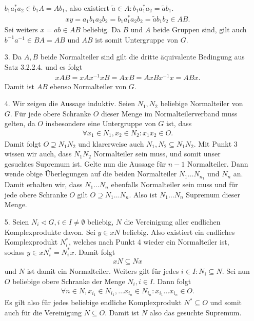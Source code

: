 \begin{solution}
\begin{itemize}
  $b_1a_1^*a_2 \in b_1A = Ab_1$, also existiert $\widetilde{a} \in A: b_1a_1^*a_2 = \widetilde{a}b_1$.
  \begin{align*}
    xy = a_1b_1a_2b_2 = b_1a_1^*a_2b_2 = \widetilde{a}b_1b_2 \in AB.
  \end{align*}
  Sei weiters $x = ab \in AB$ beliebig. Da $B$ und $A$ beide Gruppen sind, gilt
  auch $b^{-1}a^{-1} \in BA = AB$ und $AB$ ist somit Untergruppe von $G$.
  \item [3.] Da $A,B$ beide Normalteiler sind gilt die dritte äquivalente Bedingung
  aus Satz 3.2.2.4. und es folgt
  \begin{align*}
    xAB = xAx^{-1}xB = AxB = AxBx^{-1}x = ABx.
  \end{align*}
  Damit ist $AB$ ebenso Normalteiler von $G$.
  \item [4.] Wir zeigen die Aussage induktiv.
  Seien $N_1,N_2$ beliebige Normalteiler von $G$. Für jede
  obere Schranke $O$ dieser Menge im Normalteilerverband muss gelten, da $O$
  insbesondere eine Untergruppe von $G$ ist, dass
  \begin{align*}
    \forall x_1 \in N_1, x_2 \in N_2: x_1x_2 \in O.
  \end{align*}
  Damit folgt $O \supseteq N_1N_2$ und klarerweise auch $N_1,N_2 \subseteq N_1N_2$.
  Mit Punkt 3 wissen wir auch, dass $N_1N_2$
  Normalteiler sein muss, und somit unser gesuchtes Supremum ist.
  Gelte nun die Aussage für $n - 1$ Normalteiler. Dann wende obige Überlegungen
  auf die beiden Normalteiler $N_1\dots N_{n_1}$ und $N_n$ an.
  Damit erhalten wir, dass $N_1\dots N_n$ ebenfalls Normalteiler sein muss
  und für jede obere Schranke $O$ gilt $O \supseteq N_1\dots N_n$.
  Also ist $N_1\dots N_n$ Supremum dieser Menge.
  \item [5.] Seien $N_i \vartriangleleft G, i \in I \neq \emptyset$ beliebig,
  $N$ die Vereinigung aller endlichen Komplexprodukte davon.
  Sei $y \in xN$ beliebig. Also existiert ein endliches Komplexprodukt $N_i^*$,
  welches nach Punkt 4 wieder ein Normalteiler ist, sodass $y \in xN_i^* = N_i^*x$.
  Damit folgt
  \begin{align*}
    xN \subseteq Nx
  \end{align*}
  und $N$ ist damit ein Normalteiler. Weiters gilt für jedes $i \in I: N_i \subseteq N$.
  Sei nun $O$ beliebige obere Schranke der Menge $N_i, i\in I$. Dann folgt
  \begin{align*}
    \forall n \in N, x_{i_1} \in N_{i_1},\dots x_{i_n} \in N_{i_n}: x_{i_1}\dots x_{i_n} \in O.
  \end{align*}
  Es gilt also für jedes beliebige endliche Komplexprodukt $N^* \subseteq O$
  und somit auch für die Vereinigung $N \subseteq O$.
  Damit ist $N$ also das gesuchte Supremum.
\end{itemize}
\end{solution}
